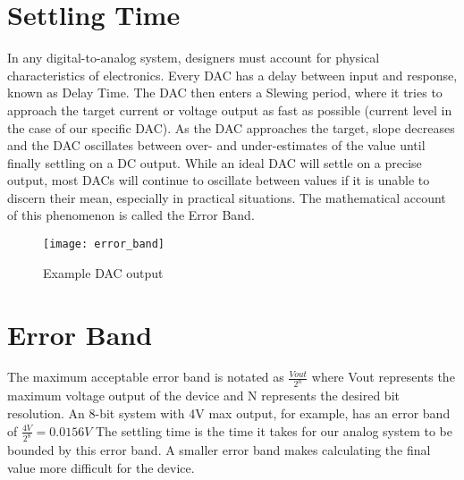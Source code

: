 \section{Settling Time}
In any digital-to-analog system, designers must account for physical characteristics of electronics. Every DAC has a delay between input and response, known as Delay Time. The DAC then enters a Slewing period, where it tries to approach the target current or voltage output as fast as possible (current level in the case of our specific DAC). As the DAC approaches the target, slope decreases and the DAC oscillates between over- and under-estimates of the value until finally settling on a DC output. While an ideal DAC will settle on a precise output, most DACs will continue to oscillate between values if it is unable to discern their mean, especially in practical situations. The mathematical account of this phenomenon is called the Error Band. \par
\begin{figure}[!htb]
	\texttt{[image: error\_band]}
	\centering
	\caption{Example DAC output}
	\centering
\end{figure}
\section{Error Band}
The maximum acceptable error band is notated as
\begin{math}
	\frac{Vout}{2^n}
\end{math}
where Vout represents the maximum voltage output of the device and N represents the desired bit resolution. An 8-bit system with 4V max output, for example, has an error band of
\begin {math}
\frac{4V}{2^8}=0.0156V
\end{math}
The settling time is the time it takes for our analog system to be bounded by this error band. A smaller error band makes calculating the final value more difficult for the device.

